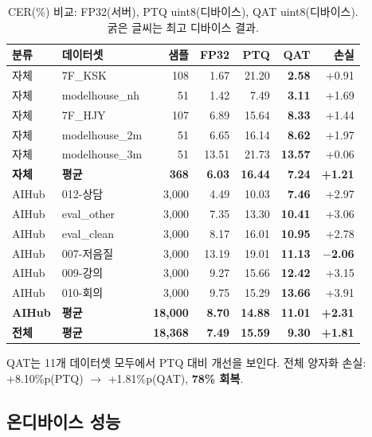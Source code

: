 \documentclass[a4paper,11pt,twocolumn]{article}
\begin{document}
\begin{table}[t]
\centering
\caption{CER(\%) 비교: FP32(서버), PTQ uint8(디바이스), QAT uint8(디바이스). 굵은 글씨는 최고 디바이스 결과.}
\small
\begin{tabular}{@{}llrrrrr@{}}
\toprule
분류 & 데이터셋 & 샘플 & FP32 & PTQ & QAT & 손실 \\
\midrule
자체 & 7F\_KSK & 108 & 1.67 & 21.20 & \textbf{2.58} & +0.91 \\
자체 & modelhouse\_nh & 51 & 1.42 & 7.49 & \textbf{3.11} & +1.69 \\
자체 & 7F\_HJY & 107 & 6.89 & 15.64 & \textbf{8.33} & +1.44 \\
자체 & modelhouse\_2m & 51 & 6.65 & 16.14 & \textbf{8.62} & +1.97 \\
자체 & modelhouse\_3m & 51 & 13.51 & 21.73 & \textbf{13.57} & +0.06 \\
\textbf{자체} & \textbf{평균} & \textbf{368} & \textbf{6.03} & \textbf{16.44} & \textbf{7.24} & \textbf{+1.21} \\
\midrule
AIHub & 012-상담 & 3,000 & 4.49 & 10.03 & \textbf{7.46} & +2.97 \\
AIHub & eval\_other & 3,000 & 7.35 & 13.30 & \textbf{10.41} & +3.06 \\
AIHub & eval\_clean & 3,000 & 8.17 & 16.01 & \textbf{10.95} & +2.78 \\
AIHub & 007-저음질 & 3,000 & 13.19 & 19.01 & \textbf{11.13} & \textbf{$-$2.06} \\
AIHub & 009-강의 & 3,000 & 9.27 & 15.66 & \textbf{12.42} & +3.15 \\
AIHub & 010-회의 & 3,000 & 9.75 & 15.29 & \textbf{13.66} & +3.91 \\
\textbf{AIHub} & \textbf{평균} & \textbf{18,000} & \textbf{8.70} & \textbf{14.88} & \textbf{11.01} & \textbf{+2.31} \\
\midrule
\textbf{전체} & \textbf{평균} & \textbf{18,368} & \textbf{7.49} & \textbf{15.59} & \textbf{9.30} & \textbf{+1.81} \\
\bottomrule
\end{tabular}
\end{table}

QAT는 11개 데이터셋 모두에서 PTQ 대비 개선을 보인다. 전체 양자화 손실: +8.10\%p(PTQ) $\rightarrow$ +1.81\%p(QAT), \textbf{78\% 회복}.

\subsection{온디바이스 성능}
\end{document}
